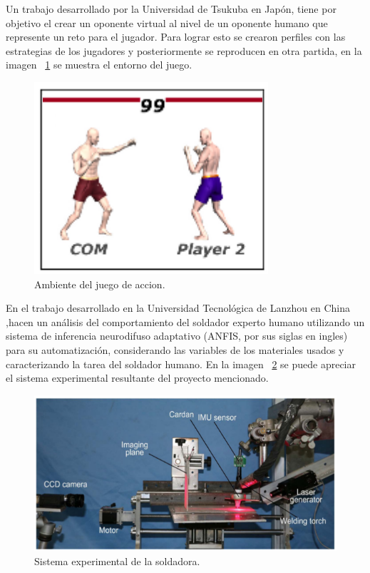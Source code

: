 Un trabajo desarrollado por la Universidad de Tsukuba en
 Japón\cite{Nakano2006}, tiene por objetivo el crear un oponente virtual
 al nivel de un oponente humano que represente un reto para el jugador. Para
 lograr esto se crearon perfiles con las estrategias de los jugadores y
 posteriormente se reproducen en otra partida, en la imagen ~\ref{fig:imitat}
 se muestra el entorno del juego.


\begin{figure}[H]
\centering
\includegraphics[width=0.5\columnwidth]{CapituloI/Imagenes/Imitating.png}
\caption{Ambiente del juego de accion.}
\label{fig:imitat}
\end{figure}


En el trabajo desarrollado en la Universidad Tecnológica de Lanzhou en China
 \cite{Zhang2017},hacen un análisis del comportamiento del soldador experto
 humano utilizando un sistema de inferencia neurodifuso adaptativo (ANFIS,
 por sus siglas en ingles) para su automatización, considerando las variables
 de los materiales usados y caracterizando la tarea del soldador humano.
 En la imagen ~\ref{fig:syswelding} se puede apreciar el sistema experimental resultante del proyecto mencionado.


\begin{figure}[H]
\centering
\includegraphics[width=0.8\columnwidth]{CapituloI/Imagenes/Welding.png}
\caption{Sistema experimental de la soldadora.}
\label{fig:syswelding}
\end{figure} 
 

